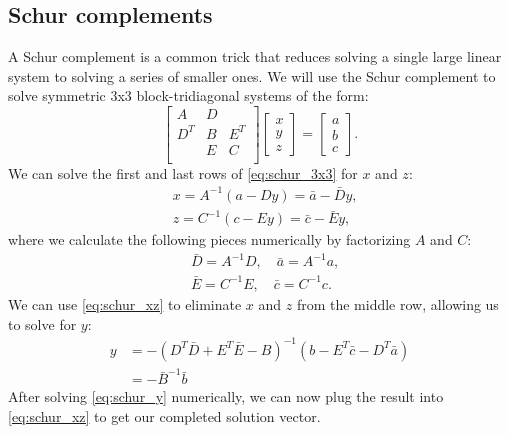 \documentclass[../root.tex]{subfiles}
\newcommand{\0}{{\transparent{0} \resizebox{\mycellheight}{\mycellheight}{0}}}
\begin{document}
\subsection{Schur complements} \label{sec:schur_complements}
A Schur complement is a common trick that reduces solving a single large linear system to solving a 
series of smaller ones. We will use the
Schur complement to solve symmetric 3x3 block-tridiagonal systems of the form: 
\begin{equation} \label{eq:schur_3x3}
    \begin{bmatrix}
        A   & D & \\
        D^T & B & E^T \\
            & E & C \\
    \end{bmatrix}
    \begin{bmatrix}
        x \\ y \\ z
    \end{bmatrix} = 
    \begin{bmatrix}
        a \\ b \\ c
    \end{bmatrix}.
\end{equation}
We can solve the first and last rows of \eqref{eq:schur_3x3} for $x$ and $z$:
\begin{subequations} \label{eq:schur_xz}
\begin{align}
    &x = A^{-1}(a - D y) = \bar{a} - \bar{D} y \label{eq:schur_x}, \\
    &z = C^{-1}(c - E y) = \bar{c} - \bar{E} y \label{eq:schur_z},
\end{align}
\end{subequations}
where we calculate the following pieces numerically by factorizing $A$ and $C$:
\begin{subequations} \label{eq:schur_temps}
\begin{align}
    &\bar{D} = A^{-1} D, \quad \bar{a} = A^{-1} a, \\
    &\bar{E} = C^{-1} E, \quad \bar{c} = C^{-1} c.
\end{align}
\end{subequations}
We can use \eqref{eq:schur_xz} to eliminate $x$ and $z$ from the middle row, allowing us to 
solve for $y$:
\begin{equation} \label{eq:schur_y}
    \begin{aligned}
        y &= -(D^T \bar{D} + E^T \bar{E} - B)^{-1}(b - E^T \bar{c} - D^T \bar{a}) \\
          &= -\bar{B}^{-1} \bar{b}
    \end{aligned}
\end{equation}
After solving \eqref{eq:schur_y} numerically, we can now plug the result into
\eqref{eq:schur_xz} to get our completed solution vector. 
\end{document}
